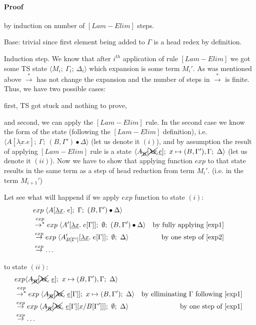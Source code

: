 \documentclass[a4paper, 10pt]{article}
\begin{document}
\paragraph{Proof} by induction on number of $[Lam-Elim]$ steps.

Base: trivial since first element being added to $\Gamma$ is a head redex by definition.

Induction step. We know that after $i^{th}$ application of rule $[Lam-Elim]$ we got some TS state $\langle M_i;\ \Gamma_i;\ \Delta_i \rangle$ which expansion is some term $M_i'$. As was mentioned above $\overset{*}{\rightarrow}$ has not change the expansion and the number of steps in $\overset{*}{\rightarrow}$ is finite. Thus, we have two possible cases:

first, TS got stuck and nothing to prove,

and second, we can apply the $[Lam-Elim]$ rule. In the second case we know the form of the state (following the $[Lam-Elim]$ definition), i.e. $\langle A[\underline{\lambda x}. e];\ \Gamma;\ (B,\Gamma')\bullet\Delta \rangle$ (let us denote it $(i)$), and by assumption the result of applying $[Lam-Elim]$ rule is a state $\langle A_{\xcancel{B}}[\xcancel{\lambda x}.\underline{e}];\ x \mapsto (B,\Gamma'),\Gamma;\ \Delta \rangle$ (let us denote it $(ii)$). Now we have to show that applying function $exp$ to that state results in the same term as a step of head reduction from term $M_i'$. (i.e. in the term $M_{i+1}'$)

Let see what will happend if we apply $exp$ function to state $(i)$:
\begin{align}
  &exp\; \langle A[\underline{\lambda x}.\; e];\ \Gamma;\ (B,\Gamma')\bullet\Delta \rangle & \\
  &\overset{exp}{\rightarrow^{*}}
  exp\; \langle A'[\underline{\lambda x}.\; e[\Gamma]];\ \emptyset;\ (B,\Gamma')\bullet\Delta \rangle &\textnormal{by fully applying \eqref{exp1}} \\
  \label{i3} &\overset{exp}{\rightarrow}
  exp\; \langle A'_{B[\Gamma']}[\underline{\lambda x}.\; e[\Gamma]];\ \emptyset;\ \Delta \rangle &\textnormal{by one step of \eqref{exp2}} \\
  &\overset{exp}{\rightarrow}
  \dots &
\end{align}

to state $(ii)$:
\begin{align}
  &exp \langle A_{\xcancel{B}}[\xcancel{\lambda x}.\; \underline{e}];\ x \mapsto (B,\Gamma'),\Gamma;\ \Delta \rangle & \\
  &\overset{exp}{\rightarrow^{*}}
  exp\;\langle A_{\xcancel{B}}[\xcancel{\lambda x}.\; \underline{e}[\Gamma]];\ x \mapsto (B,\Gamma');\ \Delta \rangle &\textnormal{by elliminating $\Gamma$ following \eqref{exp1}} \\
  \label{ii3} &\overset{exp}{\rightarrow}
  exp\; \langle A_{\xcancel{B}}[\xcancel{\lambda x}.\; \underline{e}[\Gamma][x/B[\Gamma']]];\ \emptyset;\ \Delta \rangle &\textnormal{by one step of \eqref{exp1}} \\
  &\overset{exp}{\rightarrow}
  \dots &
\end{align}
\end{document}
